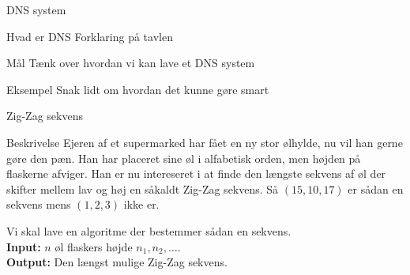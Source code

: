 \documentclass[12pt,t]{beamer}
\begin{document}
\begin{frame}{DNS system}
  \begin{block}{Hvad er DNS}
    Forklaring på tavlen
  \end{block}
  \begin{block}{Mål}
    Tænk over hvordan vi kan lave et DNS system
  \end{block}
  \pause
  \begin{exampleblock}{Eksempel}
    Snak lidt om hvordan det kunne gøre smart
  \end{exampleblock}
\end{frame}

\begin{frame}[plain]{Zig-Zag sekvens}
  \begin{block}{Beskrivelse}
    Ejeren af et supermarked har fået en ny stor ølhylde, nu vil han gerne
    gøre den pæn. Han har placeret sine øl i alfabetisk orden, men højden
    på flaskerne afviger. Han er nu intereseret i at finde den længste
    sekvens af øl der skifter mellem lav og høj en såkaldt Zig-Zag sekvens.
    Så $(15,10,17)$ er sådan en sekvens mens $(1,2,3)$ ikke er.

    Vi skal lave en algoritme der bestemmer sådan en sekvens.\\
    \textbf{Input:} $n$ øl flaskers højde $n_1, n_2, \dots$. \\
    \textbf{Output:} Den længst mulige Zig-Zag sekvens.
  \end{block}
\end{frame}
\end{document}

